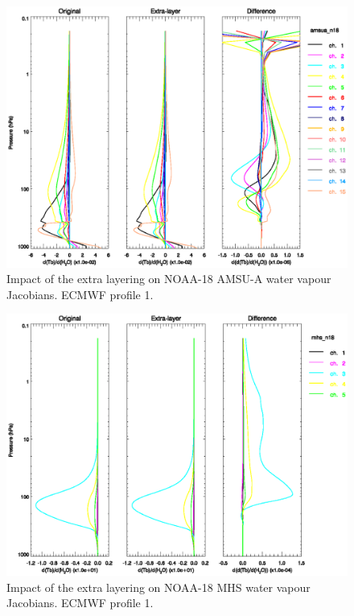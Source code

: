 \begin{figure}[htp]
  \centering
  \includegraphics[scale=0.8]{graphics/amsua_n18.h2o_k_el.p1.eps}
  \caption{Impact of the extra layering on NOAA-18 AMSU-A water vapour Jacobians. ECMWF profile 1.}
  \label{fig:amsua_n18.h2o_k_el.p1}
\end{figure}
\begin{figure}[htp]
  \centering
  \includegraphics[scale=0.8]{graphics/mhs_n18.h2o_k_el.p1.eps}
  \caption{Impact of the extra layering on NOAA-18 MHS water vapour Jacobians. ECMWF profile 1.}
  \label{fig:mhs_n18.h2o_k_el.p1}
\end{figure}

